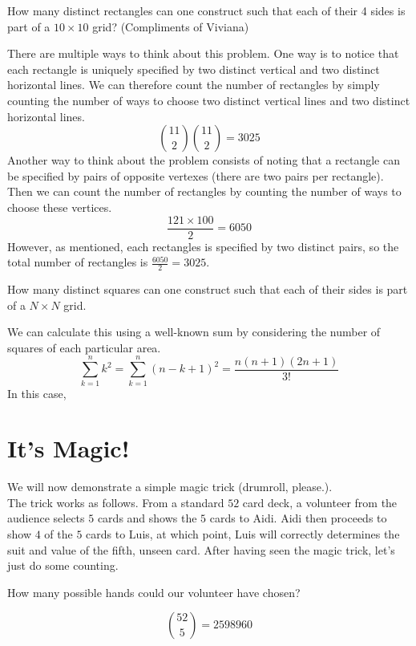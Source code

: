 \documentclass[11pt]{article}
\begin{document}
\begin{exercise}
How many distinct rectangles can one construct such that each of their 4 sides is part of a $10 \times 10$
 grid? (Compliments of Viviana)
\end{exercise}
\begin{solution}
There are multiple ways to think about this problem. One way is to notice that each rectangle is uniquely specified by two distinct vertical and two distinct horizontal lines. We can therefore count the number of rectangles by simply counting the number of ways to choose two distinct vertical lines and two distinct horizontal lines.
$$
{11 \choose 2}{11 \choose 2} = 3025
$$
Another way to think about the problem consists of noting that a rectangle can be specified by pairs of opposite vertexes (there are two pairs per rectangle). Then we can count the number of rectangles by counting the number of ways to choose these vertices.
$$
\frac{121 \times 100}{2} = 6050
$$
However, as mentioned, each rectangles is specified by two distinct pairs, so the total number of rectangles is $\frac{6050}{2} = 3025$.
\end{solution}

\begin{exercise}
How many distinct squares can one construct such that each of their sides is part of a $ N \times N$ grid.
\end{exercise}
\begin{solution}
We can calculate this using a well-known sum by considering the number of squares of each particular area.
$$
\sum_{k=1}^n k^2 = \sum_{k=1}^{n} (n-k+1)^2 = \frac{n(n+1)(2n+1)}{3!}
$$
In this case,
\end{solution}


\section*{It's Magic!}
We will now demonstrate a simple magic trick (drumroll, please.). \\
The trick works as follows. From a standard $52$ card deck, a volunteer from the audience selects $5$ cards and shows the $5$ cards to Aidi. Aidi then proceeds to show $4$ of the $5$ cards to Luis, at which point, Luis will correctly determines the suit and value of the fifth, unseen card.
After having seen the magic trick, let's just do some counting.

\begin{exercise}
How many possible hands could our volunteer have chosen?
\end{exercise}
\begin{solution}
$${52 \choose 5} = 2598960$$
\end{solution}
\end{document}
